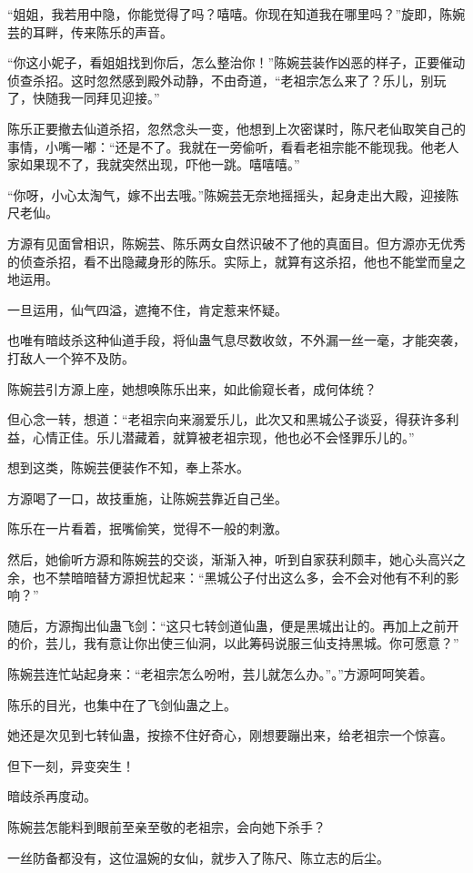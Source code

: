 \begin{this_body}
“姐姐，我若用中隐，你能觉得了吗？嘻嘻。你现在知道我在哪里吗？”旋即，陈婉芸的耳畔，传来陈乐的声音。

“你这小妮子，看姐姐找到你后，怎么整治你！”陈婉芸装作凶恶的样子，正要催动侦查杀招。这时忽然感到殿外动静，不由奇道，“老祖宗怎么来了？乐儿，别玩了，快随我一同拜见迎接。”

陈乐正要撤去仙道杀招，忽然念头一变，他想到上次密谋时，陈尺老仙取笑自己的事情，小嘴一嘟：“还是不了。我就在一旁偷听，看看老祖宗能不能现我。他老人家如果现不了，我就突然出现，吓他一跳。嘻嘻嘻。”

“你呀，小心太淘气，嫁不出去哦。”陈婉芸无奈地摇摇头，起身走出大殿，迎接陈尺老仙。

方源有见面曾相识，陈婉芸、陈乐两女自然识破不了他的真面目。但方源亦无优秀的侦查杀招，看不出隐藏身形的陈乐。实际上，就算有这杀招，他也不能堂而皇之地运用。

一旦运用，仙气四溢，遮掩不住，肯定惹来怀疑。

也唯有暗歧杀这种仙道手段，将仙蛊气息尽数收敛，不外漏一丝一毫，才能突袭，打敌人一个猝不及防。

陈婉芸引方源上座，她想唤陈乐出来，如此偷窥长者，成何体统？

但心念一转，想道：“老祖宗向来溺爱乐儿，此次又和黑城公子谈妥，得获许多利益，心情正佳。乐儿潜藏着，就算被老祖宗现，他也必不会怪罪乐儿的。”

想到这类，陈婉芸便装作不知，奉上茶水。

方源喝了一口，故技重施，让陈婉芸靠近自己坐。

陈乐在一片看着，抿嘴偷笑，觉得不一般的刺激。

然后，她偷听方源和陈婉芸的交谈，渐渐入神，听到自家获利颇丰，她心头高兴之余，也不禁暗暗替方源担忧起来：“黑城公子付出这么多，会不会对他有不利的影响？”

随后，方源掏出仙蛊飞剑：“这只七转剑道仙蛊，便是黑城出让的。再加上之前开的价，芸儿，我有意让你出使三仙洞，以此筹码说服三仙支持黑城。你可愿意？”

陈婉芸连忙站起身来：“老祖宗怎么吩咐，芸儿就怎么办。”。”方源呵呵笑着。

陈乐的目光，也集中在了飞剑仙蛊之上。

她还是次见到七转仙蛊，按捺不住好奇心，刚想要蹦出来，给老祖宗一个惊喜。

但下一刻，异变突生！

暗歧杀再度动。

陈婉芸怎能料到眼前至亲至敬的老祖宗，会向她下杀手？

一丝防备都没有，这位温婉的女仙，就步入了陈尺、陈立志的后尘。


\end{this_body}
